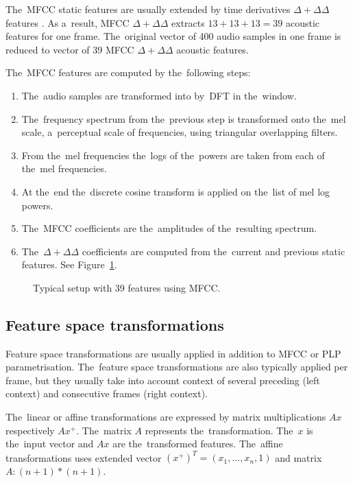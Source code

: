 The~\ac{MFCC} static features are usually extended by time derivatives $\Delta+\Delta\Delta$ features \cite{psutka2001comparison}.
As a~result, \ac{MFCC} $\Delta+\Delta\Delta$ extracts $13 + 13 + 13 = 39$ acoustic features for one frame. 
The~original vector of 400 audio samples in one frame is reduced to vector of 39 \ac{MFCC} $\Delta+\Delta\Delta$ acoustic features.

The~\ac{MFCC} features are computed by the~following steps:
\small{\begin{enumerate}
    \item The~audio samples are transformed into  by~\ac{DFT} in the~window.
    \item The~frequency spectrum from the~previous step is transformed onto the~mel scale, a~perceptual scale of frequencies, using triangular overlapping filters.
    \item From the~mel frequencies the~logs of the~powers are taken from each of the~mel frequencies.
    \item At the~end the~discrete cosine transform is applied on the~list of mel log powers.
    \item The~\ac{MFCC} coefficients are the~amplitudes of the~resulting spectrum.
    \item The~$\Delta+\Delta\Delta$ coefficients are computed from the~current and previous static features. See Figure~\ref{fig:delta}.
\end{enumerate}}

\begin{figure}
    \begin{center}
    
    \caption{Typical setup with 39 features using \ac{MFCC}.}
    \label{fig:delta} 
    \end{center}
\end{figure}

\subsection*{Feature space transformations}
Feature space transformations are usually applied in addition to \ac{MFCC} or \ac{PLP} parametrisation.
The~feature space transformations are also typically applied per frame, but they usually take into account context of several preceding (left context) and consecutive frames (right context).

The~linear or affine transformations are expressed by matrix multiplications $Ax$ respectively $Ax^+$.
The~matrix $A$ represents the~transformation. 
The~$x$ is the~input vector and $Ax$ are the~transformed features.
The~affine transformations uses extended vector $(x^+)^T = (x_1, \ldots, x_n, 1)$ and matrix $A: (n+1)*(n+1)$.

